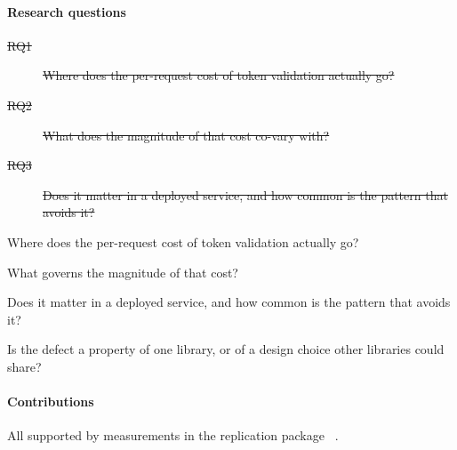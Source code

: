 \documentclass[pdflatex,sn-basic,twocolumn]{sn-jnl}%
\providecommand{\DIFadd}[1]{{\protect\color{blue}\uwave{#1}}} %
\providecommand{\DIFdel}[1]{{\protect\color{red}\sout{#1}}}                      %
\providecommand{\DIFaddbegin}{} %
\providecommand{\DIFaddend}{} %
\providecommand{\DIFdelbegin}{} %
\providecommand{\DIFdelend}{} %
\newcommand{\DIFscaledelfig}{0.5}
\newlength{\DIFdelgraphicswidth} %
\newlength{\DIFdelgraphicsheight} %
\newcommand{\DIFaddincludegraphics}[2][]{{\color{blue}\fbox{\DIFOincludegraphics[#1]{#2}}}} %
\newcommand{\DIFdelincludegraphics}[2][]{%
\sbox{\DIFdelgraphicsbox}{\DIFOincludegraphics[#1]{#2}}%
\settoboxwidth{\DIFdelgraphicswidth}{\DIFdelgraphicsbox} %
\settoboxtotalheight{\DIFdelgraphicsheight}{\DIFdelgraphicsbox} %
\scalebox{\DIFscaledelfig}{%
\parbox[b]{\DIFdelgraphicswidth}{\usebox{\DIFdelgraphicsbox}\\[-\baselineskip] \rule{\DIFdelgraphicswidth}{0em}}\llap{\resizebox{\DIFdelgraphicswidth}{\DIFdelgraphicsheight}{%
\setlength{\unitlength}{\DIFdelgraphicswidth}%
\begin{picture}(1,1)%
\thicklines\linethickness{2pt} %
{\color[rgb]{1,0,0}\put(0,0){\framebox(1,1){}}}%
{\color[rgb]{1,0,0}\put(0,0){\line( 1,1){1}}}%
{\color[rgb]{1,0,0}\put(0,1){\line(1,-1){1}}}%
\end{picture}%
}\hspace*{3pt}}} %
} %
\DeclareRobustCommand{\DIFaddbegin}{\DIFOaddbegin \let\includegraphics\DIFaddincludegraphics} %
\DeclareRobustCommand{\DIFaddend}{\DIFOaddend \let\includegraphics\DIFOincludegraphics} %
\DeclareRobustCommand{\DIFdelbegin}{\DIFOdelbegin \let\includegraphics\DIFdelincludegraphics} %
\DeclareRobustCommand{\DIFdelend}{\DIFOaddend \let\includegraphics\DIFOincludegraphics} %
\begin{document}
\paragraph{Research questions}
\DIFdelbegin %
\begin{description}%
\item[\DIFdel{RQ1}]%
\DIFdel{Where does the per-request cost of token validation actually go?
}%
\item[\DIFdel{RQ2}]%
\DIFdel{What does the magnitude of that cost co-vary with?
}%
\item[\DIFdel{RQ3}]%
\DIFdel{Does it matter in a deployed service, and how common is the pattern
           that avoids it?
}
\end{description}%
\DIFdelend \DIFaddbegin \begin{list}{}{\setlength{\labelwidth}{2.2em}\setlength{\labelsep}{0.5em}%
  \setlength{\leftmargin}{2.7em}\setlength{\itemsep}{1pt}\setlength{\topsep}{2pt}%
  \setlength{\parsep}{0pt}\renewcommand{\makelabel}[1]{\textbf{#1}\hfill}}
\item[\DIFadd{RQ1}] Where does the per-request cost of token validation actually go?
\item[\DIFadd{RQ2}] What governs the magnitude of that cost?
\item[\DIFadd{RQ3}] Does it matter in a deployed service, and how common is the
  pattern that avoids it?
\item[\DIFadd{RQ4}] Is the defect a property of one library, or of a design choice
  other libraries could share?
\end{list}
\DIFaddend 

\paragraph{Contributions} All supported by measurements in the replication
package~\DIFdelbegin %
\DIFdelend \DIFaddbegin \citep{artifact2026}\DIFaddend .
\end{document}
